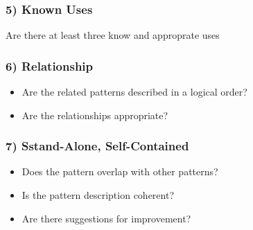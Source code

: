 \subsubsection{5) Known Uses}
Are there at least three know and approprate uses

\subsubsection{6) Relationship}
\begin{itemize}
    \item Are the related patterns described in a logical order?
    \item Are the relationships appropriate?
\end{itemize}

\subsubsection{7) Sstand-Alone, Self-Contained}
\begin{itemize}
    \item Does the pattern overlap with other patterns?
    \item Is the pattern description coherent?
    \item Are there suggestions for improvement?
\end{itemize}